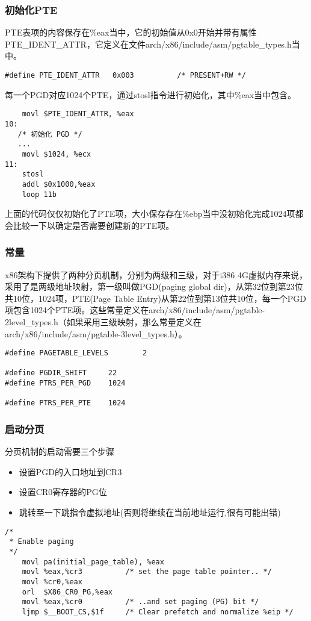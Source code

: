 \documentclass[b5paper,9pt,twoside,openany]{article}
\begin{document}
\subsubsection{初始化PTE}
PTE表项的内容保存在\%eax当中，它的初始值从0x0开始并带有属性PTE\_IDENT\_ATTR，它定义在文件arch/x86/include/asm/pgtable\_types.h当中。
\begin{lstlisting}
#define PTE_IDENT_ATTR   0x003          /* PRESENT+RW */
\end{lstlisting}

每一个PGD对应1024个PTE，通过stosl指令进行初始化，其中\%eax当中包含。
\begin{lstlisting}
    movl $PTE_IDENT_ATTR, %eax
10:
   /* 初始化 PGD */
   ...
    movl $1024, %ecx
11:
    stosl
    addl $0x1000,%eax
    loop 11b
\end{lstlisting}
上面的代码仅仅初始化了PTE项，大小保存存在\%ebp当中没初始化完成1024项都会比较一下以确定是否需要创建新的PTE项。

\subsubsection{常量}
x86架构下提供了两种分页机制，分别为两级和三级，对于i386 4G虚拟内存来说，采用了是两级地址映射，第一级叫做PGD(paging global dir)，从第32位到第23位共10位，1024项，PTE(Page Table Entry)从第22位到第13位共10位，每一个PGD项包含1024个PTE项。这些常量定义在arch/x86/include/asm/pgtable-2level\_types.h（如果采用三级映射，那么常量定义在arch/x86/include/asm/pgtable-3level\_types.h）。
\begin{lstlisting}
#define PAGETABLE_LEVELS        2

#define PGDIR_SHIFT     22
#define PTRS_PER_PGD    1024

#define PTRS_PER_PTE    1024
\end{lstlisting}

\subsubsection{启动分页}
分页机制的启动需要三个步骤
\begin{itemize}
\item 设置PGD的入口地址到CR3
\item 设置CR0寄存器的PG位
\item 跳转至一下跳指令虚拟地址(否则将继续在当前地址运行,很有可能出错)
\end{itemize}
\begin{lstlisting}
/*
 * Enable paging
 */
    movl pa(initial_page_table), %eax
    movl %eax,%cr3          /* set the page table pointer.. */
    movl %cr0,%eax
    orl  $X86_CR0_PG,%eax
    movl %eax,%cr0          /* ..and set paging (PG) bit */
    ljmp $__BOOT_CS,$1f     /* Clear prefetch and normalize %eip */
\end{lstlisting}
\end{document}
